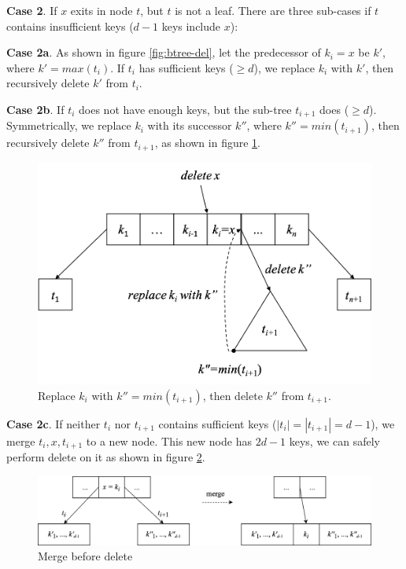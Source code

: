 \documentclass[b5paper]{article}
\begin{document}
\textbf{Case 2}. If $x$ exits in node $t$, but $t$ is not a leaf. There are three sub-cases if $t$ contains insufficient keys ($d - 1$ keys include $x$):

\textbf{Case 2a}. As shown in figure \ref{fig:btree-del}, let the predecessor of $k_i = x$ be $k'$, where $k' = max(t_i)$. If $t_i$ has sufficient keys ($\geq d$), we replace $k_i$ with $k'$, then recursively delete $k'$ from $t_i$.

\textbf{Case 2b}. If $t_i$ does not have enough keys, but the sub-tree $t_{i+1}$ does ($\geq d$). Symmetrically, we replace $k_i$ with its successor $k''$, where $k'' = min(t_{i+1})$, then recursively delete $k''$ from $t_{i+1}$, as shown in figure \ref{fig:btree-del-case2b}.

\begin{figure}[htbp]
  \centering
  \includegraphics[scale=0.5]{img/btree-del-case2b.png}
  \caption{Replace $k_i$ with $k'' = min(t_{i+1})$, then delete $k''$ from $t_{i+1}$.}
  \label{fig:btree-del-case2b}
\end{figure}

\textbf{Case 2c}. If neither $t_i$ nor $t_{i+1}$ contains sufficient keys ($|t_i| = |t_{i+1}| = d - 1$), we merge $t_i, x, t_{i+1}$ to a new node. This new node has $2d - 1$ keys, we can safely perform delete on it as shown in figure \ref{fig:btree-del-merge}.

\begin{figure}[htbp]
  \centering
  \includegraphics[scale=0.65]{img/btree-del-merge.png}
  \caption{Merge before delete}
  \label{fig:btree-del-merge}
\end{figure}
\end{document}
